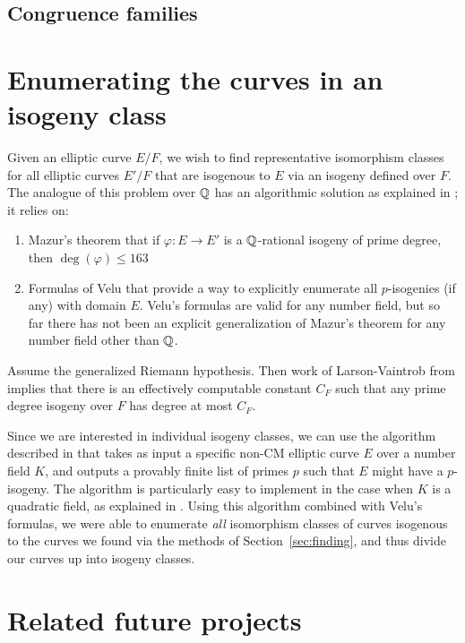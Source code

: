 \documentclass{amsart}
\begin{document}
\subsection{Congruence families}

\section{Enumerating the curves in an isogeny class}\label{sec:isoclass}

Given an elliptic curve $E/F$, we wish to find representative
isomorphism classes for all elliptic curves $E'/F$ that are isogenous
to $E$ via an isogeny defined over $F$. The analogue of this problem
over $\mathbb{Q}$ has an algorithmic solution as explained in
\cite[\S3.8]{cremona:algs}; it relies on:
\begin{enumerate}
\item  Mazur's theorem \cite{mazur:rational} 
that if $\varphi:E\to E'$ is a $\mathbb{Q}$-rational isogeny of prime degree, 
then $\deg(\varphi)\leq 163$
\item Formulas of Velu \cite{velu:isogenies} 
that provide a way to explicitly enumerate all $p$-isogenies (if any) with domain $E$.  
Velu's formulas are valid for any number field, but so far there has not been an explicit
generalization of Mazur's theorem for any number field other than $\mathbb{Q}$. 
\end{enumerate}

\begin{remark}
  Assume the generalized Riemann hypothesis.  Then work of Larson-Vaintrob 
  from \cite{larson-vaintrob} implies that there is an effectively computable constant $C_F$ 
  such that any prime degree isogeny over $F$ has degree at most $C_F$.
\end{remark}

Since we are interested in individual isogeny classes, 
we can use the algorithm described in \cite{billerey:isog} that takes as
input a specific non-CM elliptic curve $E$ over a number field $K$, and
outputs a provably finite list of primes $p$ such that $E$ might have a
$p$-isogeny. The algorithm is particularly easy to implement in the
case when $K$ is a quadratic field, as explained in
\cite[\S2.3.4]{billerey:isog}.  Using this algorithm combined with
Velu's formulas, we were able to enumerate {\em all}
isomorphism classes of curves isogenous to the curves we found via the
methods of Section~\ref{sec:finding}, and thus divide our curves up into
isogeny classes.


\section{Related future projects}\label{sec:future}
\end{document}
